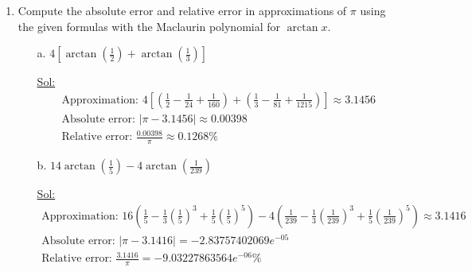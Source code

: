 \begin{enumerate}
\item Compute the absolute error and relative error in approximations
  of \( \pi \) using the given formulas with the Maclaurin polynomial
  for \( \arctan x \).
  \begin{itemize}
    \item[a.] \( 4\left[\arctan\left(\frac{1}{2}\right) +
      \arctan\left(\frac{1}{3}\right)\right] \)

      \underline{Sol:}\\
      \[
        \begin{array}{l}
          \textrm{Approximation: } 4\left[\left(\frac{1}{2} -
            \frac{1}{24} + \frac{1}{160}\right) + \left(\frac{1}{3} -
          \frac{1}{81} + \frac{1}{1215}\right)\right] \approx 3.1456 \\
          \textrm{Absolute error: } |\pi - 3.1456| \approx 0.00398 \\
          \textrm{Relative error: } \frac{0.00398}{\pi} \approx 0.1268\%
        \end{array}
      \]
      \bigbreak

    \item[b.] \( 14\arctan\left(\frac{1}{5}\right) -
      4\arctan\left(\frac{1}{239}\right) \)

      \underline{Sol:}\\
      \[
        \begin{array}{l}
          \textrm{Approximation: } 16\left(\frac{1}{5} -
            \frac{1}{3}\left(\frac{1}{5}\right)^3 +
          \frac{1}{5}\left(\frac{1}{5}\right)^5\right) -
          4\left(\frac{1}{239} -
            \frac{1}{3}\left(\frac{1}{239}\right)^3 +
          \frac{1}{5}\left(\frac{1}{239}\right)^5\right) \approx 3.1416 \\
          \textrm{Absolute error: } |\pi - 3.1416| = -2.83757402069e^{-05} \\
          \textrm{Relative error: } \frac{3.1416}{\pi} = -9.03227863564e^{-06}\%
        \end{array}
      \]
      \bigbreak
  \end{itemize}
\end{enumerate}
